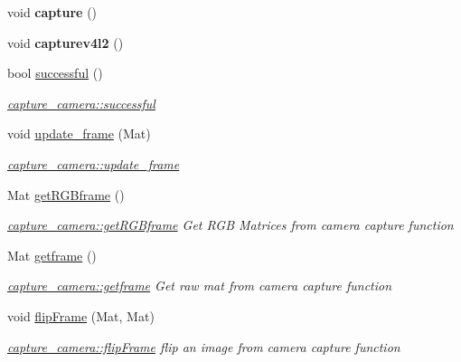 \begin{DoxyCompactItemize}
\mbox{\label{classcapture__camera_a287af5e4774458096d7cfc7c5c838cc9}} 
void {\bfseries capture} ()
\item 
\mbox{\label{classcapture__camera_afd406ecac1bcde016a91bf98623f3829}} 
void {\bfseries capturev4l2} ()
\item 
bool \mbox{\hyperlink{classcapture__camera_acba0e792dbd2136b7a6273e1fe0f05a4}{successful}} ()
\begin{DoxyCompactList}\small\item\em \mbox{\hyperlink{classcapture__camera_acba0e792dbd2136b7a6273e1fe0f05a4}{capture\+\_\+camera\+::successful}} \end{DoxyCompactList}\item 
void \mbox{\hyperlink{classcapture__camera_a07d88d50c866430da2dd5cf4362c2a67}{update\+\_\+frame}} (Mat)
\begin{DoxyCompactList}\small\item\em \mbox{\hyperlink{classcapture__camera_a07d88d50c866430da2dd5cf4362c2a67}{capture\+\_\+camera\+::update\+\_\+frame}} \end{DoxyCompactList}\item 
Mat \mbox{\hyperlink{classcapture__camera_a65e6760360f14c149612f2280aed23dc}{get\+R\+G\+Bframe}} ()
\begin{DoxyCompactList}\small\item\em \mbox{\hyperlink{classcapture__camera_a65e6760360f14c149612f2280aed23dc}{capture\+\_\+camera\+::get\+R\+G\+Bframe}} Get R\+GB Matrices from camera capture function \end{DoxyCompactList}\item 
Mat \mbox{\hyperlink{classcapture__camera_ac0efa824fd11a5e77ff11114c5e6d0bc}{getframe}} ()
\begin{DoxyCompactList}\small\item\em \mbox{\hyperlink{classcapture__camera_ac0efa824fd11a5e77ff11114c5e6d0bc}{capture\+\_\+camera\+::getframe}} Get raw mat from camera capture function \end{DoxyCompactList}\item 
void \mbox{\hyperlink{classcapture__camera_a4c624aa08561057ba402c8728f7693c5}{flip\+Frame}} (Mat, Mat)
\begin{DoxyCompactList}\small\item\em \mbox{\hyperlink{classcapture__camera_a4c624aa08561057ba402c8728f7693c5}{capture\+\_\+camera\+::flip\+Frame}} flip an image from camera capture function \end{DoxyCompactList}\item 

\end{DoxyCompactItemize}
